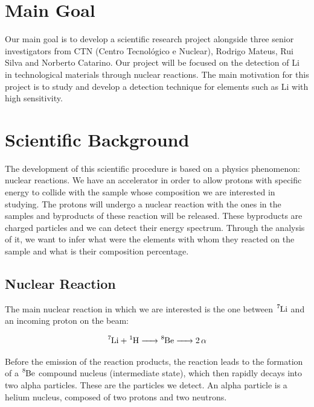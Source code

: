 \documentclass{article}
\begin{document}
\begin{multicols}{2}

\section{Main Goal}
    \label{sec:maingoal}

Our main goal is to develop a scientific research project alongside three senior investigators from CTN (Centro Tecnológico e Nuclear), Rodrigo Mateus, Rui Silva and Norberto Catarino.
Our project will be focused on the detection of Li in technological materials through nuclear reactions. The main motivation for this project is to study and develop a detection technique for elements such as Li with high sensitivity. 

\section{Scientific Background}
    \label{sec:scientificbackground}

The development of this scientific procedure is based on a physics phenomenon: nuclear reactions. We have an accelerator in order to allow protons with specific energy to collide with the sample whose composition we are interested in studying. The protons will undergo a nuclear reaction with the ones in the samples and byproducts of these reaction will be released. These byproducts are charged particles and we can detect their energy spectrum. Through the analysis of it, we want to infer what were the elements with whom they reacted on the sample and what is their composition percentage.

\subsection{Nuclear Reaction}
    \label{sec:nuclearreactions}

The main nuclear reaction in which we are interested is the one between $\ce{^7Li}$ and an incoming proton on the beam:

\begin{equation}
  \ce{^7Li + ^1H -> ^8Be -> 2\alpha}
\label{eq:reactionLi}
\end{equation}

Before the emission of the reaction products, the reaction leads to the formation of a $\ce{^8Be}$ compound nucleus (intermediate state), which then rapidly decays into two alpha particles. These are the particles we detect. An alpha particle is a helium nucleus, composed of two protons and two neutrons.


\end{multicols}
\end{document}
